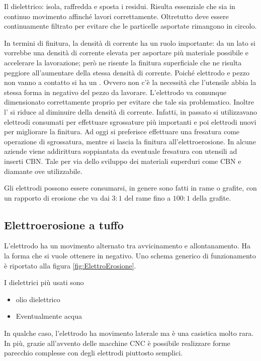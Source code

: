 Il dielettrico: isola, raffredda e sposta i residui. Risulta essenziale che sia in continuo movimento affinché lavori correttamente. Oltretutto deve essere continuamente filtrato per evitare che le particelle asportate rimangono in circolo. 

In termini di finitura, la densità di corrente ha un ruolo importante: da un lato si vorrebbe una densità di corrente elevata per asportare più materiale possibile e accelerare la lavorazione; però ne risente la finitura superficiale che ne risulta peggiore all'aumentare della stessa densità di corrente.
Poiché elettrodo e pezzo non vanno a contatto si ha un . Ovvero non c'è la necessità che l'utensile abbia la stessa forma in negativo del pezzo da lavorare. L'elettrodo va comunque dimensionato correttamente proprio per evitare che tale  sia problematico.
Inoltre l' si riduce al diminuire della densità di corrente.
Infatti, in passato si utilizzavano elettrodi consumati per effettuare sgrossature più importanti e poi elettrodi nuovi per migliorare la finitura.
Ad oggi si preferisce effettuare una fresatura come operazione di sgrossatura, mentre si lascia la finitura all'elettroerosione.
In alcune aziende viene addirittura soppiantata da eventuale fresatura con utensili ad inserti CBN. Tale per via dello sviluppo dei materiali superduri come CBN e diamante ove utilizzabile.

Gli elettrodi possono essere consumarsi, in genere sono fatti in rame o grafite, con un rapporto di erosione che va dai $3:1$ del rame fino a $100:1$ della grafite.

\subsection{Elettroerosione a tuffo}
L'elettrodo ha un movimento alternato tra avvicinamento e allontanamento.
Ha la forma che si vuole ottenere in negativo.
Uno schema generico di funzionamento è riportato alla figura \ref{fig:ElettroErosione}.

I dielettrici più usati sono
\begin{itemize}
\item olio dielettrico
\item Eventualmente acqua
\end{itemize}
In qualche caso, l'elettrodo ha movimento laterale ma è una casistica molto rara.
In più, grazie all'avvento delle macchine \ac{CNC} è possibile realizzare forme parecchio complesse con degli elettrodi piuttosto semplici.

